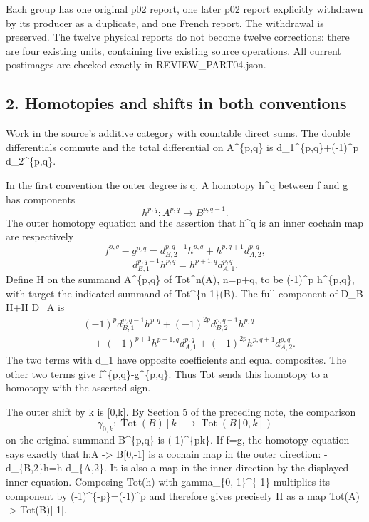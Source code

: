 \documentclass[11pt]{article}
\begin{document}
Each group has one original p02 report, one later p02 report explicitly withdrawn by its producer as a duplicate, and one French report. The withdrawal is preserved. The twelve physical reports do not become twelve corrections: there are four existing units, containing five existing source operations. All current postimages are checked exactly in REVIEW\_PART04.json.

\subsection{2. Homotopies and shifts in both conventions}\label{note-04-homotopies-and-shifts-in-both-conventions}

Work in the source's additive category with countable direct sums. The double differentials commute and the total differential on A\^{}\{p,q\} is d\_1\^{}\{p,q\}+(-1)\^{}p d\_2\^{}\{p,q\}.

In the first convention the outer degree is q. A homotopy h\^{}q between f and g has components \[
h^{p,q}:A^{p,q}\longrightarrow B^{p,q-1}.
\] The outer homotopy equation and the assertion that h\^{}q is an inner cochain map are respectively \[
f^{p,q}-g^{p,q}
=d_{B,2}^{p,q-1}h^{p,q}+h^{p,q+1}d_{A,2}^{p,q},
\] \[
d_{B,1}^{p,q-1}h^{p,q}=h^{p+1,q}d_{A,1}^{p,q}.
\] Define H on the summand A\^{}\{p,q\} of Tot\^{}n(A), n=p+q, to be (-1)\^{}p h\^{}\{p,q\}, with target the indicated summand of Tot\^{}\{n-1\}(B). The full component of D\_B H+H D\_A is \[
\begin{aligned}
&(-1)^p d_{B,1}^{p,q-1}h^{p,q}
 +(-1)^{2p}d_{B,2}^{p,q-1}h^{p,q}\\
&\hspace{1em}
 +(-1)^{p+1}h^{p+1,q}d_{A,1}^{p,q}
 +(-1)^{2p}h^{p,q+1}d_{A,2}^{p,q}.
\end{aligned}
\] The two terms with d\_1 have opposite coefficients and equal composites. The other two terms give f\^{}\{p,q\}-g\^{}\{p,q\}. Thus Tot sends this homotopy to a homotopy with the asserted sign.

The outer shift by k is {[}0,k{]}. By Section 5 of the preceding note, the comparison \[
\gamma_{0,k}:\operatorname{Tot}(B)[k]
\longrightarrow\operatorname{Tot}(B[0,k])
\] on the original summand B\^{}\{p,q\} is (-1)\^{}\{pk\}. If f=g, the homotopy equation says exactly that h:A -\textgreater{} B{[}0,-1{]} is a cochain map in the outer direction: -d\_\{B,2\}h=h d\_\{A,2\}. It is also a map in the inner direction by the displayed inner equation. Composing Tot(h) with gamma\_\{0,-1\}\^{}\{-1\} multiplies its component by (-1)\^{}\{-p\}=(-1)\^{}p and therefore gives precisely H as a map Tot(A) -\textgreater{} Tot(B){[}-1{]}.
\end{document}

